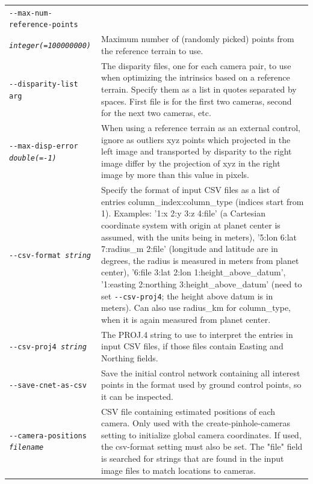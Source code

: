 \begin{longtable}{|p{8cm}|p{9cm}|}
\texttt{-\/-max-num-reference-points} \\
\texttt{\textit{integer(=100000000)}}   & Maximum number of (randomly picked) points from the reference terrain to use.\\ \hline

\texttt{-\/-disparity-list arg} & The disparity files, one for each camera pair, to use when optimizing the intrinsics based on a reference terrain. Specify them as a list in quotes separated by spaces. First file is for the first two cameras, second for the next two cameras, etc. \\ \hline

\texttt{-\/-max-disp-error \textit{double(=-1)}} & When using a reference terrain as an external control, ignore as outliers xyz points which projected in the left image and transported by disparity to the right image differ by the projection of xyz in the right image by more than this value in pixels.\\ \hline

\texttt{-\/-csv-format \textit{string}} & Specify the format of input
CSV files as a list of entries column\_index:column\_type (indices start
from 1). Examples: '1:x 2:y 3:z 4:file' (a Cartesian coordinate system with
origin at planet center is assumed, with the units being in meters),
'5:lon 6:lat 7:radius\_m 2:file' (longitude and latitude are in degrees, the
radius is measured in meters from planet center), '6:file 3:lat 2:lon
1:height\_above\_datum', '1:easting 2:northing 3:height\_above\_datum'
(need to set \texttt{-\/-csv-proj4}; the height above datum is in
meters). Can also use radius\_km for column\_type, when it is again
measured from planet center.\\ \hline

\texttt{-\/-csv-proj4 \textit{string}} & The PROJ.4 string to use to
interpret the entries in input CSV files, if those files contain Easting
and Northing fields. \\ \hline

\texttt{-\/-save-cnet-as-csv} & Save the initial control network containing all interest points in the format used by ground control points, so it can be inspected. \\ \hline

\texttt{-\/-camera-positions \textit{filename}} & CSV file containing estimated positions of each camera.
Only used with the create-pinhole-cameras setting to initialize global camera coordinates. If used,
the csv-format setting must also be set.  The "file" field is searched for strings that are found
in the input image files to match locations to cameras.\\ \hline


\end{longtable}
